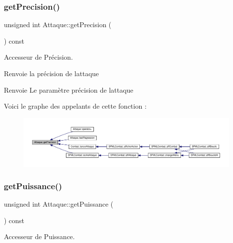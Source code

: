 \subsubsection{\texorpdfstring{get\+Precision()}{getPrecision()}}
{\footnotesize\ttfamily unsigned int Attaque\+::get\+Precision (\begin{DoxyParamCaption}{ }\end{DoxyParamCaption}) const}



Accesseur de Précision. 

Renvoie la précision de l\textquotesingle{}attaque \begin{DoxyReturn}{Renvoie}
Le paramètre précision de l\textquotesingle{}attaque 
\end{DoxyReturn}
Voici le graphe des appelants de cette fonction \+:\nopagebreak
\begin{figure}[H]
\begin{center}
\leavevmode
\includegraphics[width=350pt]{class_attaque_ada8c22f0becc001b46e6a7f2da00a1ef_icgraph}
\end{center}
\end{figure}
\mbox{\label{class_attaque_a92ae062d505e82c80621069dc6a917d1}} 
\subsubsection{\texorpdfstring{get\+Puissance()}{getPuissance()}}
{\footnotesize\ttfamily unsigned int Attaque\+::get\+Puissance (\begin{DoxyParamCaption}{ }\end{DoxyParamCaption}) const}



Accesseur de Puissance. 


